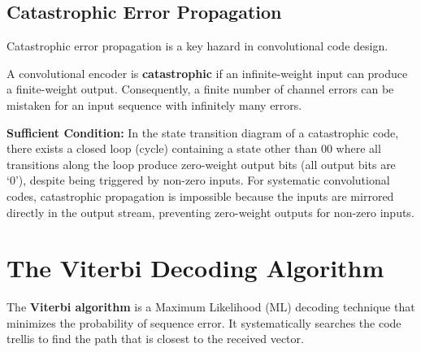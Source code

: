 \documentclass[12pt,a4paper]{article}
\begin{document}
\subsection{Catastrophic Error Propagation}
Catastrophic error propagation is a key hazard in convolutional code design.
\begin{tcolorbox}[defbox, title={\textbf{Catastrophic Error Propagation}}]
A convolutional encoder is \textbf{catastrophic} if an infinite-weight input can produce a finite-weight output. Consequently, a finite number of channel errors can be mistaken for an input sequence with infinitely many errors.
\end{tcolorbox}
\textbf{Sufficient Condition:} In the state transition diagram of a catastrophic code, there exists a closed loop (cycle) containing a state other than $00$ where all transitions along the loop produce zero-weight output bits (all output bits are `0'), despite being triggered by non-zero inputs. 
For systematic convolutional codes, catastrophic propagation is impossible because the inputs are mirrored directly in the output stream, preventing zero-weight outputs for non-zero inputs.

\section{The Viterbi Decoding Algorithm}

The \textbf{Viterbi algorithm} is a Maximum Likelihood (ML) decoding technique that minimizes the probability of sequence error. It systematically searches the code trellis to find the path that is closest to the received vector.
\end{document}
